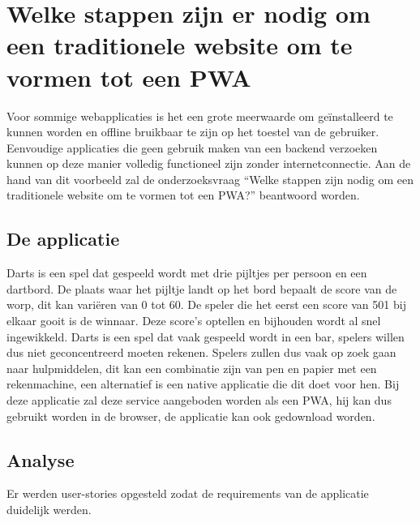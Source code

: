 \chapter{Welke stappen zijn er nodig om een traditionele website om te vormen tot een PWA}
\label{ch:TransformerenNaarEenPWA}



Voor sommige webapplicaties is het een grote meerwaarde om geïnstalleerd te kunnen worden  en offline bruikbaar te zijn op het toestel van de gebruiker.\autocite{Mozilla2020c} Eenvoudige applicaties die geen gebruik maken van een backend verzoeken kunnen op deze manier volledig functioneel zijn zonder internetconnectie. 
Aan de hand van dit voorbeeld zal de onderzoeksvraag “Welke stappen zijn nodig om een traditionele website om te vormen tot een PWA?” beantwoord worden.

\section{De applicatie}

	Darts is een spel dat gespeeld wordt met drie pijltjes per persoon en een dartbord. De plaats waar het pijltje landt op het bord bepaalt de score van de worp, dit kan variëren van 0 tot 60. De speler die het eerst een score van 501 bij elkaar gooit is de winnaar. Deze score’s optellen en bijhouden wordt al snel ingewikkeld. Darts is een spel dat vaak gespeeld wordt in een bar, spelers willen dus niet geconcentreerd moeten rekenen. Spelers zullen dus vaak op zoek gaan naar hulpmiddelen, dit kan een combinatie zijn van pen en papier met een rekenmachine, een alternatief is een native applicatie die dit doet voor hen. Bij deze applicatie zal deze service aangeboden worden als een PWA, hij kan dus gebruikt worden in de browser, de applicatie kan ook gedownload worden.

\section{Analyse}

	Er werden user-stories opgesteld zodat de requirements van de applicatie duidelijk werden.  
	
